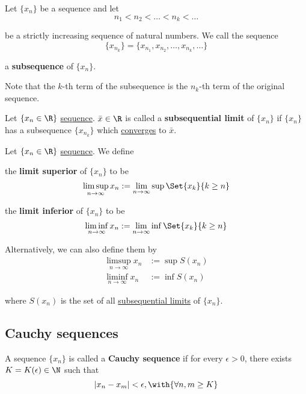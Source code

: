 \label{c6b3a49}

Let $\{x_n\}$ be a sequence and let
$$
  n_1<n_2<\ldots<n_k<\ldots
$$

be a strictly increasing sequence of natural numbers. We call the sequence
$$
  \{x_{n_k}\}=\{x_{n_1},x_{n_2},\ldots,x_{n_k},\ldots\}
$$

a \textbf{subsequence} of $\{x_n\}$.

Note that the $k$-th term of the subsequence is the $n_k$-th term of the
original sequence.

\label{fd942fa}

Let $\{x_n\in\R\}$ \href{b5fa0e4}{sequence}. $\bar x\in\R$ is called a
\textbf{subsequential limit} of $\{x_n\}$ if $\{x_n\}$ has a subsequence
$\{x_{n_k}\}$ which \href{de3e28a}{converges} to $\bar x$.

\label{f4f2af4}

Let $\{x_n\in\R\}$ \href{b5fa0e4}{sequence}. We define

\begin{enumerati}
  \item the \textbf{limit superior} of $\{x_n\}$ to be
  $$
    \limsup_{n\to\infty}x_n:=\lim_{n\to\infty}\sup\Set{x_k}{k\geq n}
  $$
  \item the \textbf{limit inferior} of $\{x_n\}$ to be
  $$
    \liminf_{n\to\infty}x_n:=\lim_{n\to\infty}\inf\Set{x_k}{k\geq n}
  $$
\end{enumerati}

Alternatively, we can also define them by
\begin{align*}
  \limsup_{n\to\infty}x_n &:=\sup S(x_n) \\
  \liminf_{n\to\infty}x_n &:=\inf S(x_n)
\end{align*}

where $S(x_n)$ is the set of all \href{fd942fa}{subsequential limits} of
$\{x_n\}$.

\subsection{Cauchy sequences}\label{dda0b11}

\label{a8f670d}

A sequence $\{x_n\}$ is called a \textbf{Cauchy sequence} if for every
$\epsilon>0$, there exists $K=K(\epsilon)\in\N$ such that
$$
  |x_n-x_m|<\epsilon,\with{\forall n,m\geq K}
$$

